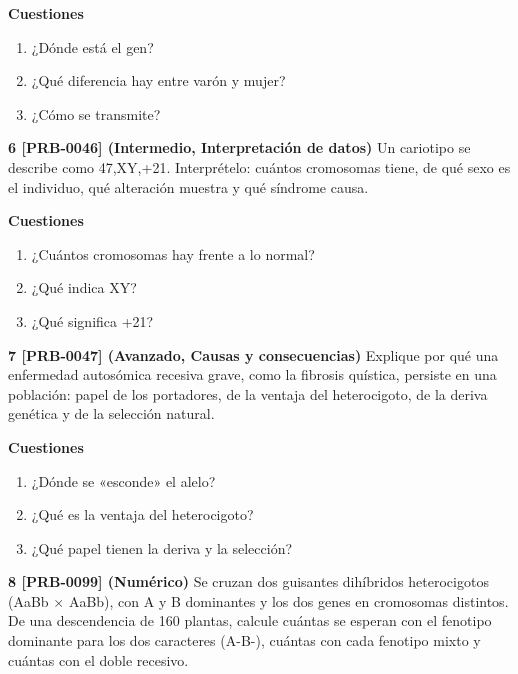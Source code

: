 \documentclass{book}
\begin{document}
\begin{tcolorbox}[title={Ejercicios}, studiumworked, breakable]
\noindent\textbf{Cuestiones}
\begin{enumerate}
\item ¿Dónde está el gen?
\item ¿Qué diferencia hay entre varón y mujer?
\item ¿Cómo se transmite?
\end{enumerate}

\noindent\textbf{6 [PRB-0046] (Intermedio, Interpretación de datos)}
Un cariotipo se describe como 47,XY,+21. Interprételo: cuántos cromosomas tiene, de qué sexo es el individuo, qué alteración muestra y qué síndrome causa.


\noindent\textbf{Cuestiones}
\begin{enumerate}
\item ¿Cuántos cromosomas hay frente a lo normal?
\item ¿Qué indica XY?
\item ¿Qué significa +21?
\end{enumerate}

\noindent\textbf{7 [PRB-0047] (Avanzado, Causas y consecuencias)}
Explique por qué una enfermedad autosómica recesiva grave, como la fibrosis quística, persiste en una población: papel de los portadores, de la ventaja del heterocigoto, de la deriva genética y de la selección natural.


\noindent\textbf{Cuestiones}
\begin{enumerate}
\item ¿Dónde se «esconde» el alelo?
\item ¿Qué es la ventaja del heterocigoto?
\item ¿Qué papel tienen la deriva y la selección?
\end{enumerate}

\noindent\textbf{8 [PRB-0099] (Numérico)}
Se cruzan dos guisantes dihíbridos heterocigotos (AaBb \(\times\) AaBb), con A y B dominantes y los dos genes en cromosomas distintos. De una descendencia de 160 plantas, calcule cuántas se esperan con el fenotipo dominante para los dos caracteres (A-B-), cuántas con cada fenotipo mixto y cuántas con el doble recesivo.

\end{tcolorbox}
\end{document}
